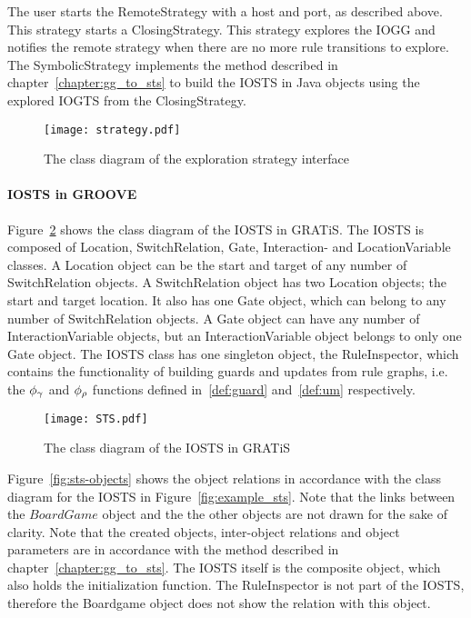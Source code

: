 The user starts the RemoteStrategy with a host and port, as described above. This strategy starts a ClosingStrategy. This strategy explores the IOGG and notifies the remote strategy when there are no more rule transitions to explore. The SymbolicStrategy implements the method described in chapter~\ref{chapter:gg_to_sts} to build the IOSTS in Java objects using the explored IOGTS from the ClosingStrategy.
 
\begin{figure}[ht]
  \begin{center}
    \texttt{[image: strategy.pdf]}
  \end{center}
  \caption{The class diagram of the exploration strategy interface}
  \label{fig:esi-diagram}
\end{figure}

\paragraph*{IOSTS in GROOVE}
Figure~\ref{fig:sts-diagram} shows the class diagram of the IOSTS in GRATiS. The IOSTS is composed of Location, SwitchRelation, Gate, Interaction- and LocationVariable classes. A Location object can be the start and target of any number of SwitchRelation objects. A SwitchRelation object has two Location objects; the start and target location. It also has one Gate object, which can belong to any number of SwitchRelation objects. A Gate object can have any number of InteractionVariable objects, but an InteractionVariable object belongs to only one Gate object. The IOSTS class has one singleton object, the RuleInspector, which contains the functionality of building guards and updates from rule graphs, i.e. the $\phi_{\gamma}$ and $\phi_{\rho}$ functions defined in~\ref{def:guard} and~\ref{def:um} respectively.

\begin{figure}[ht]
  \begin{center}
    \texttt{[image: STS.pdf]}
  \end{center}
  \caption{The class diagram of the IOSTS in GRATiS}
  \label{fig:sts-diagram}
\end{figure}

Figure~\ref{fig:sts-objects} shows the object relations in accordance with the class diagram for the IOSTS in Figure~\ref{fig:example_sts}. Note that the links between the $\mathit{BoardGame}$ object and the the other objects are not drawn for the sake of clarity. Note that the created objects, inter-object relations and object parameters are in accordance with the method described in chapter~\ref{chapter:gg_to_sts}. The IOSTS itself is the composite object, which also holds the initialization function. The RuleInspector is not part of the IOSTS, therefore the Boardgame object does not show the relation with this object.


